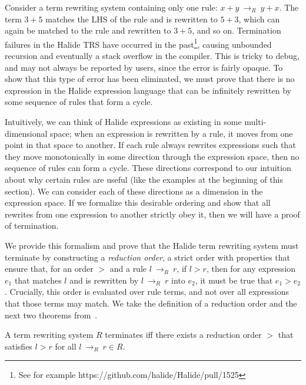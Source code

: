 \documentclass[acmsmall,review]{acmart}\settopmatter{printfolios=true,printccs=false,printacmref=false}
\newcommand{\rewrites}[0]{\:\rightarrow_{R}\:}
\begin{document}
Consider a term
rewriting system containing only one rule: $x + y \rewrites y + x$. The term
$3 + 5$ matches the LHS of the rule and is rewritten to $5 + 3$, which can again
be matched to the rule and rewritten to $3 + 5$, and so on. Termination failures in the Halide TRS have occurred in the past\footnote{See for example https://github.com/halide/Halide/pull/1525}, causing unbounded recursion and eventually a stack overflow in the compiler. This is tricky to debug, and may not always be reported by users, since the error is fairly opaque. To show that this type of error has been eliminated, we must prove that there is no expression in the Halide expression language that can be infinitely rewritten by some sequence of rules that form a cycle.

Intuitively, we can think of Halide expressions as existing in some multi-dimensional space; when an expression is rewritten by a rule, it moves from one point in that space to another. If each rule always rewrites expressions such that they move monotonically in some direction through the expression space, then no sequence of rules can form a cycle. These directions correspond to our intuition about why certain rules are useful (like the examples at the beginning of this section). We can consider each of these directions as a dimension in the expression space. If we formalize this desirable ordering and show that all rewrites from one expression to another strictly obey it, then we will have a proof of termination.

We provide this formalism and prove that the Halide term rewriting system must terminate by constructing a \emph{reduction order}, a strict order with properties that ensure that, for an order $>$ and a rule $l \rewrites r$, if $l > r$, then for any expression $e_1$ that matches $l$ and is rewritten by $l \rewrites r$ into $e_2$, it must be true that $e_1 > e_2$. Crucially, this order is evaluated over rule terms, and not over all expressions that those terms may match. We take the definition of a reduction order and the next two theorems from~\citet{baader1999term}.

\begin{theorem}\label{theorem:terminates}
A term rewriting system $R$ terminates iff there exists a reduction order $>$ that satisfies $l > r$ for all $l \rewrites r \in R$.
\end{theorem}
\end{document}
